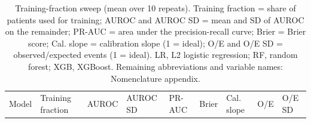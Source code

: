 \documentclass[
  11pt,
]{article}
\begin{document}
\begin{longtable}[]{@{}
  >{\raggedright\arraybackslash}p{}
  >{\raggedright\arraybackslash}p{}
  >{\raggedright\arraybackslash}p{}
  >{\raggedright\arraybackslash}p{}
  >{\raggedright\arraybackslash}p{}
  >{\raggedright\arraybackslash}p{}
  >{\raggedright\arraybackslash}p{}
  >{\raggedright\arraybackslash}p{}
  >{\raggedright\arraybackslash}p{}@{}}
\caption{Training-fraction sweep (mean over 10 repeats). Training
fraction = share of patients used for training; AUROC and AUROC SD =
mean and SD of AUROC on the remainder; PR-AUC = area under the
precision-recall curve; Brier = Brier score; Cal. slope = calibration
slope (1 = ideal); O/E and O/E SD = observed/expected events (1 =
ideal). LR, L2 logistic regression; RF, random forest; XGB, XGBoost.
Remaining abbreviations and variable names: Nomenclature
appendix.}\tabularnewline
\toprule\noalign{}
\begin{minipage}[b]{\linewidth}\raggedright
Model
\end{minipage} & \begin{minipage}[b]{\linewidth}\raggedright
Training fraction
\end{minipage} & \begin{minipage}[b]{\linewidth}\raggedright
AUROC
\end{minipage} & \begin{minipage}[b]{\linewidth}\raggedright
AUROC SD
\end{minipage} & \begin{minipage}[b]{\linewidth}\raggedright
PR-AUC
\end{minipage} & \begin{minipage}[b]{\linewidth}\raggedright
Brier
\end{minipage} & \begin{minipage}[b]{\linewidth}\raggedright
Cal. slope
\end{minipage} & \begin{minipage}[b]{\linewidth}\raggedright
O/E
\end{minipage} & \begin{minipage}[b]{\linewidth}\raggedright
O/E SD
\end{minipage} \\

\end{longtable}
\end{document}
